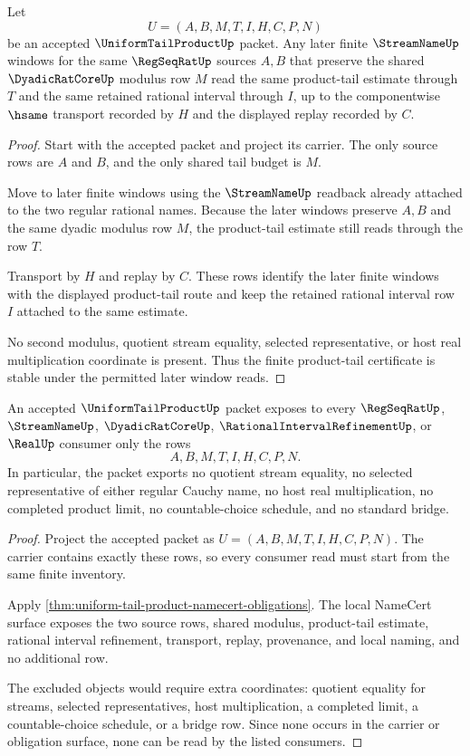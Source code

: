 \begin{theorem}
\label{thm:uniform-tail-product-stability}
Let
$$
U=(A,B,M,T,I,H,C,P,N)
$$
be an accepted $\UniformTailProductUp$ packet. Any later finite $\StreamNameUp$ windows for the same $\RegSeqRatUp$ sources $A,B$ that preserve the shared $\DyadicRatCoreUp$ modulus row $M$ read the same product-tail estimate through $T$ and the same retained rational interval through $I$, up to the componentwise $\hsame$ transport recorded by $H$ and the displayed replay recorded by $C$.
\end{theorem}
\begin{proof}
Start with the accepted packet and project its carrier. The only source rows are $A$ and $B$, and the only shared tail budget is $M$.

Move to later finite windows using the $\StreamNameUp$ readback already attached to the two regular rational names. Because the later windows preserve $A,B$ and the same dyadic modulus row $M$, the product-tail estimate still reads through the row $T$.

Transport by $H$ and replay by $C$. These rows identify the later finite windows with the displayed product-tail route and keep the retained rational interval row $I$ attached to the same estimate.

No second modulus, quotient stream equality, selected representative, or host real multiplication coordinate is present. Thus the finite product-tail certificate is stable under the permitted later window reads.
\end{proof}

\begin{theorem}
\label{thm:uniform-tail-product-ledger-exhaustion}
An accepted $\UniformTailProductUp$ packet exposes to every $\RegSeqRatUp$, $\StreamNameUp$, $\DyadicRatCoreUp$, $\RationalIntervalRefinementUp$, or $\RealUp$ consumer only the rows
$$
A,B,M,T,I,H,C,P,N .
$$
In particular, the packet exports no quotient stream equality, no selected representative of either regular Cauchy name, no host real multiplication, no completed product limit, no countable-choice schedule, and no standard bridge.
\end{theorem}
\begin{proof}
Project the accepted packet as $U=(A,B,M,T,I,H,C,P,N)$. The carrier contains exactly these rows, so every consumer read must start from the same finite inventory.

Apply \autoref{thm:uniform-tail-product-namecert-obligations}. The local NameCert surface exposes the two source rows, shared modulus, product-tail estimate, rational interval refinement, transport, replay, provenance, and local naming, and no additional row.

The excluded objects would require extra coordinates: quotient equality for streams, selected representatives, host multiplication, a completed limit, a countable-choice schedule, or a bridge row. Since none occurs in the carrier or obligation surface, none can be read by the listed consumers.
\end{proof}

